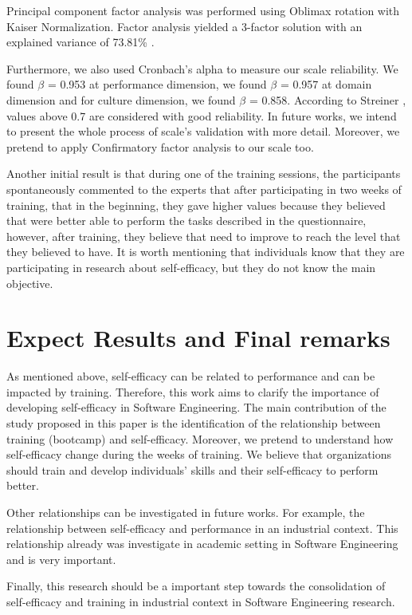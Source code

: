 \documentclass[10pt, conference]{IEEEtran}
\begin{document}
Principal component factor analysis was performed using Oblimax rotation
with Kaiser Normalization. Factor analysis yielded a 3-factor solution with an explained variance of 73.81\% .

Furthermore, we also used Cronbach's alpha to measure our scale reliability. We found $\beta$ = 0.953 at performance dimension, we found $\beta$ = 0.957 at domain dimension and for culture dimension, we found $\beta$ = 0.858. According to Streiner \cite{streiner2003being}, values above 0.7 are considered with good reliability.  In future works, we intend to present the whole process of scale's validation with more detail. Moreover, we pretend to apply Confirmatory factor analysis to our scale too. 

Another initial result is that during one of the training sessions, the participants spontaneously commented to the experts that after participating in two weeks of training, that in the beginning, they gave higher values because they believed that were better able to perform the tasks described in the questionnaire, however, after training, they believe that need to improve to reach the level that they believed to have. It is worth mentioning that individuals know that they are participating in research about self-efficacy, but they do not know the main objective.



\section{Expect Results and Final remarks}

As mentioned above, self-efficacy can be related to performance and can be impacted by training. Therefore, this work aims to clarify the importance of developing self-efficacy in Software Engineering. 
The main contribution of the study proposed in this paper is the identification of the relationship between training (bootcamp) and self-efficacy. Moreover, we pretend to understand how self-efficacy change during the weeks of training.  We believe that organizations should train and develop individuals' skills and their self-efficacy to perform better. 

Other relationships can be investigated in future works. For example, the relationship between self-efficacy and performance in an industrial context.  This relationship already was investigate in academic setting \cite{davazdahemami2018training} in Software Engineering and is very important. 

Finally, this research should be a important step towards the consolidation of self-efficacy and training in industrial context in Software Engineering research.





\end{document}
